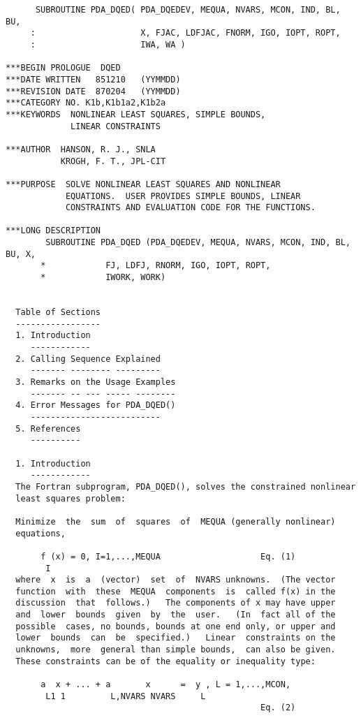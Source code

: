 \begin{verbatim}
      SUBROUTINE PDA_DQED( PDA_DQEDEV, MEQUA, NVARS, MCON, IND, BL, BU, 
     :                     X, FJAC, LDFJAC, FNORM, IGO, IOPT, ROPT, 
     :                     IWA, WA )

***BEGIN PROLOGUE  DQED
***DATE WRITTEN   851210   (YYMMDD)
***REVISION DATE  870204   (YYMMDD)
***CATEGORY NO. K1b,K1b1a2,K1b2a
***KEYWORDS  NONLINEAR LEAST SQUARES, SIMPLE BOUNDS,
             LINEAR CONSTRAINTS

***AUTHOR  HANSON, R. J., SNLA
           KROGH, F. T., JPL-CIT

***PURPOSE  SOLVE NONLINEAR LEAST SQUARES AND NONLINEAR
            EQUATIONS.  USER PROVIDES SIMPLE BOUNDS, LINEAR
            CONSTRAINTS AND EVALUATION CODE FOR THE FUNCTIONS.

***LONG DESCRIPTION
        SUBROUTINE PDA_DQED (PDA_DQEDEV, MEQUA, NVARS, MCON, IND, BL, BU, X,
       *            FJ, LDFJ, RNORM, IGO, IOPT, ROPT,
       *            IWORK, WORK)


  Table of Sections
  -----------------
  1. Introduction
     ------------
  2. Calling Sequence Explained
     ------- -------- ---------
  3. Remarks on the Usage Examples
     ------- -- --- ----- --------
  4. Error Messages for PDA_DQED()
     --------------------------
  5. References
     ----------

  1. Introduction
     ------------
  The Fortran subprogram, PDA_DQED(), solves the constrained nonlinear
  least squares problem:

  Minimize  the  sum  of  squares  of  MEQUA (generally nonlinear)
  equations,

       f (x) = 0, I=1,...,MEQUA                    Eq. (1)
        I
  where  x  is  a  (vector)  set  of  NVARS unknowns.  (The vector
  function  with  these  MEQUA  components  is  called f(x) in the
  discussion  that  follows.)   The components of x may have upper
  and  lower  bounds  given  by  the  user.   (In  fact all of the
  possible  cases, no bounds, bounds at one end only, or upper and
  lower  bounds  can  be  specified.)   Linear  constraints on the
  unknowns,  more  general than simple bounds,  can also be given.
  These constraints can be of the equality or inequality type:

       a  x + ... + a       x      =  y , L = 1,...,MCON,
        L1 1         L,NVARS NVARS     L
                                                   Eq. (2)


\end{verbatim}
